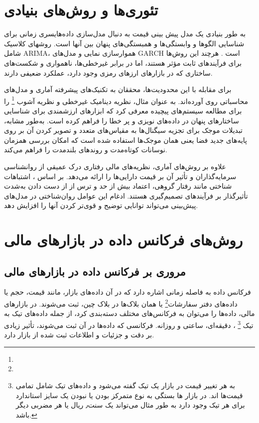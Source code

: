 {\section{تئوری‌ها و روش‌های بنیادی}
به طور بنیادی یک مدل پیش بینی قیمت به دنبال مدل‌سازی داده‌هایسری زمانی برای شناسایی الگوها و وابستگی‌ها و همبستگی‌های پنهان بین آنها است. روشهای کلاسیک شامل ARIMA، هموارسازی نمایی و مدل‌های GARCH است \cite{box2015time}. هرچند این روش‌ها برای فرآیندهای ثابت مؤثر هستند، اما در برابر غیرخطی‌ها، ناهمواری و شکست‌های ساختاری که در بازارهای ارزهای رمزی وجود دارد، عملکرد ضعیفی دارند.

برای مقابله با این محدودیت‌ها، محققان به تکنیک‌های پیشرفته آماری و مدل‌های محاسباتی روی آورده‌اند. به عنوان مثال، \cite{tsay2010analysis} نظریه دینامیک غیرخطی و نظریه آشوب \footnote{} را برای مطالعه سیستم‌های پیچیده معرفی کرد که ابزارهای ارزشمندی برای شناسایی ساختارهای پنهان در داده‌های نویزی و پر خطا را فراهم کرده است. به‌طور مشابه، تبدیلات موجک \cite{mallat1999wavelet} برای تجزیه سیگنال‌ها به مقیاس‌های متعدد و تصویر کردن آن بر روی پایه‌های جدید فضا یعنی همان موجک‌ها استفاده شده است که امکان بررسی همزمان نوسانات کوتاه‌مدت و روندهای بلندمدت را فراهم می‌کند.

علاوه بر روش‌های آماری، نظریه‌های مالی رفتاری درک عمیقی از روانشناسی سرمایه‌گذاران و تأثیر آن بر قیمت دارایی‌ها را ارائه می‌دهد. بر اساس \cite{kahneman2011thinking}، اشتباهات شناختی مانند رفتار گروهی، اعتماد بیش از حد و ترس از از دست دادن به‌شدت تأثیرگذار بر فرآیندهای تصمیم‌گیری هستند. ادغام این عوامل روان‌شناختی در مدل‌های پیش‌بینی می‌تواند توانایی توضیح و قوی‌تر کردن آنها را افزایش دهد.

\section{روش‌های فرکانس داده در بازارهای مالی}

\subsection{مروری بر فرکانس داده در بازارهای مالی}
فرکانس داده به فاصله زمانی اشاره دارد که در آن داده‌های بازار، مانند قیمت، حجم یا داده‌های دفتر سفارشات\footnote{} یا همان بلاک‌ها در بلاک چین، ثبت می‌شوند. در بازارهای مالی، داده‌ها را می‌توان به فرکانس‌های مختلف دسته‌بندی کرد، از جمله داده‌های تیک به تیک \footnote{ به هر تغییر قیمت در بازار یک تیک گفته می‌شود و داده‌های تیک شامل تمامی قیمت‌ها اند. در بازار ها بستگی به نوع متمرکز بودن یا نبودن یک سایز استاندارد برای هر تیک وجود دارد به طور مثال می‌تواند یک سنت٫ ریال یا هر مضربی دیگر باشد.}
، دقیقه‌ای، ساعتی و روزانه. فرکانسی که داده‌ها در آن ثبت می‌شوند، تأثیر زیادی بر دقت و جزئیات و اطلاعات ثبت شده از بازار دارد.


}
